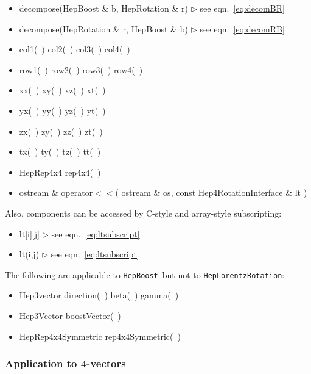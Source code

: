 \documentclass[twoside,12pt]{article}
\def \LT {{\tt HepLorentzRotation}}
\def \LB {{\tt HepBoost}}
\newcommand {\see}[1] {\hfill$\triangleright$ see eqn.~#1}
\newenvironment{shortlist}{%
\begin{itemize}
\setlength{\itemsep}{0pt}
\setlength{\parskip}{0pt}
}{%
\end{itemize}
}
\begin{document}
\begin{shortlist}
  \item decompose(HepBoost \& b, HepRotation \& r)  	\see{\ref{eq:decomBR}}
  \item decompose(HepRotation \& r, HepBoost \& b)  	\see{\ref{eq:decomRB}}
  \item col1(~) \/\/\/ col2(~) \/\/\/ col3(~) \/\/\/ col4(~) 
  \item row1(~) \/\/\/ row2(~) \/\/\/ row3(~) \/\/\/ row4(~) 
  \item xx(~) \/\/\/ xy(~) \/\/\/ xz(~) \/\/\/ xt(~) 
  \item yx(~) \/\/\/ yy(~) \/\/\/ yz(~) \/\/\/ yt(~) 
  \item zx(~) \/\/\/ zy(~) \/\/\/ zz(~) \/\/\/ zt(~) 
  \item tx(~) \/\/\/ ty(~) \/\/\/ tz(~) \/\/\/ tt(~) 

  \item HepRep4x4 rep4x4(~) 	
\end{shortlist}

\begin{shortlist}
  \item ostream \& operator$<<$( ostream \& os, const Hep4RotationInterface \& lt )
\end{shortlist}

\noindent
Also, components can be accessed by C-style and array-style subscripting:
\begin{shortlist}
  \item lt[i][j] \see{\ref{eq:ltsubscript}}
  \item lt(i,j)  \see{\ref{eq:ltsubscript}}
\end{shortlist}

The following are applicable to \LB\ but not to \LT:

\begin{shortlist}
  \item Hep3vector direction(~)	\/\/\/ beta(~) \/\/\/ gamma(~)
  \item Hep3Vector boostVector(~)
  \item HepRep4x4Symmetric rep4x4Symmetric(~) 
\end{shortlist}

\subsubsection{Application to 4-vectors}
\end{document}
